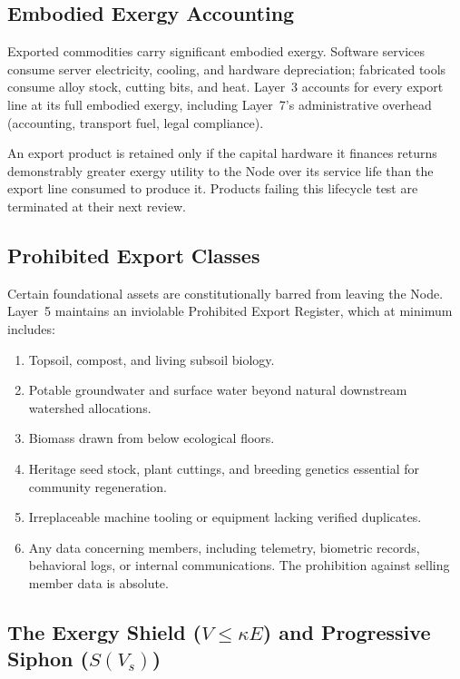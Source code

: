 \subsection{Embodied Exergy Accounting}

Exported commodities carry significant embodied exergy. Software services consume server electricity, cooling, and hardware depreciation; fabricated tools consume alloy stock, cutting bits, and heat. Layer~3 accounts for every export line at its full embodied exergy, including Layer~7's administrative overhead (accounting, transport fuel, legal compliance).

An export product is retained only if the capital hardware it finances returns demonstrably greater exergy utility to the Node over its service life than the export line consumed to produce it. Products failing this lifecycle test are terminated at their next review.

\subsection{Prohibited Export Classes}

Certain foundational assets are constitutionally barred from leaving the Node. Layer~5 maintains an inviolable Prohibited Export Register, which at minimum includes:
\begin{enumerate}
  \item Topsoil, compost, and living subsoil biology.
  \item Potable groundwater and surface water beyond natural downstream watershed allocations.
  \item Biomass drawn from below ecological floors.
  \item Heritage seed stock, plant cuttings, and breeding genetics essential for community regeneration.
  \item Irreplaceable machine tooling or equipment lacking verified duplicates.
  \item Any data concerning members, including telemetry, biometric records, behavioral logs, or internal communications. The prohibition against selling member data is absolute.
\end{enumerate}

\subsection{\texorpdfstring{The Exergy Shield ($V \le \kappa E$) and Progressive Siphon ($S(V_s)$)}{The Exergy Shield and Progressive Siphon}}

